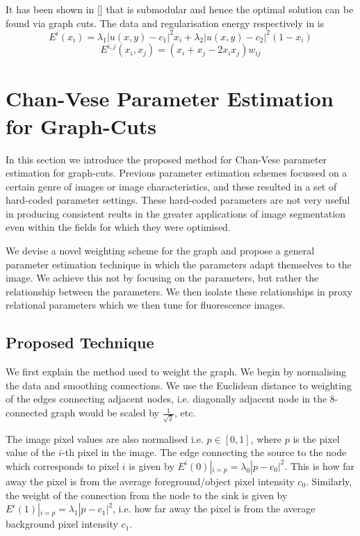 \documentclass[10pt, journal, letterpaper, onecolumn, draftcls]{IEEEtran}
\begin{document}
It has been shown in [] that  is submodular and hence the optimal solution can be found via graph cuts. The data and regularisation energy respectively in  is
\begin{equation}
	E^i(x_i) = \lambda_1 |u(x,y)-c_1|^2 x_i + \lambda_2 |u(x,y)-c_2|^2 (1-x_i)
\end{equation}
\begin{equation}
	E^{i,j}(x_i,x_j) = (x_i + x_j - 2x_ix_j)w_{ij}
\end{equation}

\section{Chan-Vese Parameter Estimation for Graph-Cuts}
\label{sec:Proptechnique}
In this section we introduce the proposed method for Chan-Vese parameter estimation for graph-cuts. Previous parameter estimation schemes focussed on a certain genre of images or image characteristics, and these resulted in a set of hard-coded parameter settings. These hard-coded parameters are not very useful in producing consistent reults in the greater applications of image segmentation even within the fields for which they were optimised.

We devise a novel weighting scheme for the graph and propose a general parameter estimation technique in which the parameters adapt themselves to the image. We achieve this not by focusing on the parameters, but rather the relationship between the parameters. We then isolate these relationships in proxy relational parameters which we then tune for fluorescence images.

\subsection{Proposed Technique}
We first explain the method used to weight the graph. We begin by normalising the data and smoothing connections. We use the Euclidean distance to weighting of the edges connecting adjacent nodes, i.e. diagonally adjacent node in the 8-connected graph would be scaled by $\frac{1}{\sqrt{2}}$, etc.

The image pixel values are also normalised i.e. $p \in [0,1]$, where $p$ is the pixel value of the $i$-th pixel in the image. The edge connecting the source to the node which corresponds to pixel $i$ is given by  $E^i(0)|_{i=p} = \lambda_0|p-c_0|^2$. This is how far away the pixel is from the average foreground/object pixel intensity $c_0$.  Similarly, the weight of the connection from the node to the sink is given by $E^i(1)|_{i=p}=\lambda_1|p-c_1|^2$, i.e. how far away the pixel is from the average background pixel intensity $c_1$.
\end{document}
